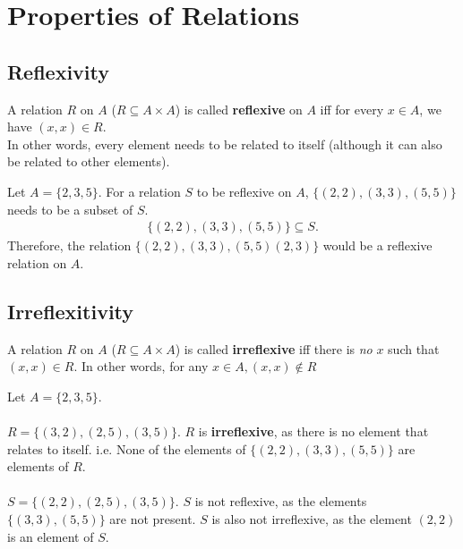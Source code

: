 \documentclass[../notes.tex]{subfiles}
\begin{document}
		\section{Properties of Relations}
			\subsection{Reflexivity}
				A relation $R$ on $A$ ($R \subseteq A \times A$) is called \textbf{reflexive} on $A$ iff for every $x \in A$, we have $(x, x) \in R$.\\
				In other words, every element needs to be related to itself (although it can also be related to other elements).
				\begin{example}
					Let $A = \{2, 3, 5\}$. For a relation $S$ to be reflexive on $A$, $\bigl\{(2, 2), (3, 3), (5, 5)\bigr\}$ needs to be a subset of $S$.
						\begin{align*}
							\bigl\{(2, 2), (3, 3), (5, 5)\bigr\} \subseteq S.
						\end{align*}
					Therefore, the relation $\bigl\{(2, 2), (3, 3), (5, 5) (2, 3)\bigr\}$ would be a reflexive relation on $A$.
				\end{example}
			\subsection{Irreflexitivity}
				A relation $R$ on $A$ ($R \subseteq A \times A$) is called \textbf{irreflexive} iff there is \textit{no} $x$ such that $(x, x) \in R$. In other words, for any $x \in A, (x, x) \notin R$
				\begin{example}
					Let $A = \{2, 3, 5\}$.\\
					\vspace{2mm}\\
					$R = \bigl\{(3, 2), (2, 5), (3, 5)\bigr\}$. $R$ is \textbf{irreflexive}, as there is no element that relates to itself. i.e. None of the elements of $\bigl\{(2, 2), (3, 3), (5, 5)\bigr\}$ are elements of $R$.\\
					\vspace{2mm}\\
					$S = \bigl\{(2, 2), (2, 5), (3, 5)\bigr\}$. $S$ is not reflexive, as the elements $\bigl\{(3, 3), (5, 5)\bigr\}$ are not present. $S$ is also not irreflexive, as the element $(2, 2)$ is an element of $S$.
				\end{example}
\end{document}
